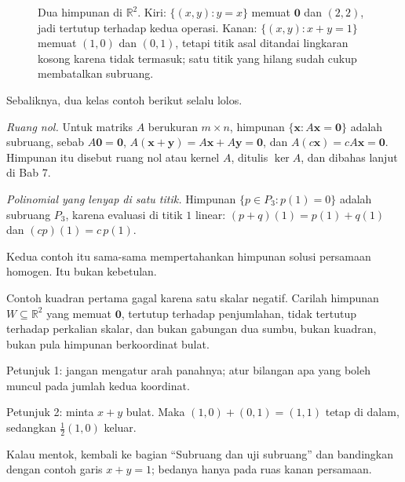 \begin{figure}[htbp]
\centering
{}
\caption{Dua himpunan di $\mathbb{R}^{2}$. Kiri: $\{(x,y):y=x\}$ memuat $\mathbf{0}$ dan
$(2,2)$, jadi tertutup terhadap kedua operasi. Kanan: $\{(x,y):x+y=1\}$ memuat $(1,0)$ dan
$(0,1)$, tetapi titik asal ditandai lingkaran kosong karena tidak termasuk; satu titik yang
hilang sudah cukup membatalkan subruang.}
\label{fig:ch06-garis}
\end{figure}



Sebaliknya, dua kelas contoh berikut selalu lolos.

\emph{Ruang nol.} Untuk matriks $A$ berukuran $m\times n$, himpunan
$\{\mathbf{x}:A\mathbf{x}=\mathbf{0}\}$ adalah subruang, sebab $A\mathbf{0}=\mathbf{0}$,
$A(\mathbf{x}+\mathbf{y})=A\mathbf{x}+A\mathbf{y}=\mathbf{0}$, dan
$A(c\mathbf{x})=cA\mathbf{x}=\mathbf{0}$. Himpunan itu disebut ruang nol atau kernel $A$,
ditulis $\ker A$, dan dibahas lanjut di Bab 7.

\emph{Polinomial yang lenyap di satu titik.} Himpunan
$\{p\in P_{3}:p(1)=0\}$ adalah subruang $P_{3}$, karena evaluasi di titik $1$ linear:
$(p+q)(1)=p(1)+q(1)$ dan $(cp)(1)=c\,p(1)$.

Kedua contoh itu sama-sama mempertahankan himpunan solusi persamaan homogen. Itu bukan
kebetulan.
\begin{tantangan}
Contoh kuadran pertama gagal karena satu skalar negatif. Carilah himpunan
$W\subseteq\mathbb{R}^{2}$ yang memuat $\mathbf{0}$, tertutup terhadap penjumlahan, tidak
tertutup terhadap perkalian skalar, dan bukan gabungan dua sumbu, bukan kuadran, bukan pula
himpunan berkoordinat bulat.

Petunjuk 1: jangan mengatur arah panahnya; atur bilangan apa yang boleh muncul pada jumlah
kedua koordinat.

Petunjuk 2: minta $x+y$ bulat. Maka $(1,0)+(0,1)=(1,1)$ tetap di dalam, sedangkan
$\tfrac{1}{2}(1,0)$ keluar.

Kalau mentok, kembali ke bagian ``Subruang dan uji subruang'' dan bandingkan dengan contoh
garis $x+y=1$; bedanya hanya pada ruas kanan persamaan.
\end{tantangan}



